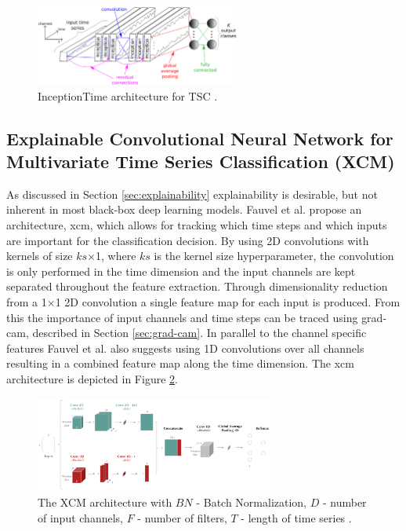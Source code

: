\begin{figure}
  \centering
  \includegraphics[width=0.6\textwidth]{files/figs/tsc/inceptiontime.png}
  \caption{InceptionTime architecture for TSC \cite{IsmailFawaz2020}.}
  \label{fig:inceptiontime}
\end{figure}


\subsection{Explainable Convolutional Neural Network for Multivariate Time Series Classification (XCM)} \label{sec:XCM}
As discussed in Section \ref{sec:explainability} explainability is desirable, but not inherent in most black-box deep learning models. Fauvel et al. \cite{Fauvel2020} propose an architecture, \gls{xcm}, which allows for tracking which time steps and which inputs are important for the classification decision. By using 2D convolutions with kernels of size $ks$$\times$1, where $ks$ is the kernel size hyperparameter, the convolution is only performed in the time dimension and the input channels are kept separated throughout the feature extraction. Through dimensionality reduction from a 1$\times$1 2D convolution a single feature map for each input is produced. From this the importance of input channels and time steps can be traced using \gls{grad-cam}, described in Section \ref{sec:grad-cam}. In parallel to the channel specific features Fauvel et al. also suggests using 1D convolutions over all channels resulting in a combined feature map along the time dimension. The \gls{xcm} architecture is depicted in Figure \ref{fig:xcm}.

\begin{figure}
  \centering
  \includegraphics[width=0.7\textwidth]{files/figs/tsc/xcm.png}
  \caption{The XCM architecture with $BN$ - Batch Normalization, $D$ - number of input channels, $F$ - number of filters, $T$ - length of time series \cite{Fauvel2020}.}
  \label{fig:xcm}
\end{figure}

